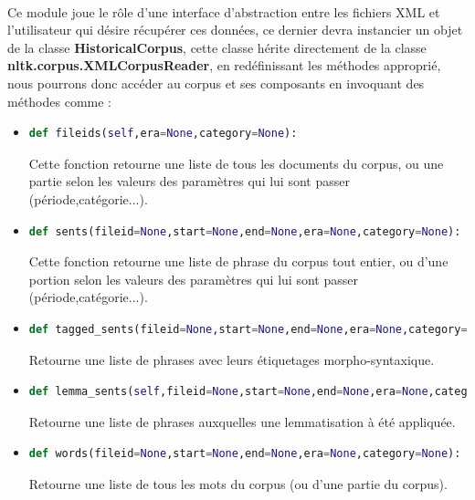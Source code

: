 \documentclass[]{report}
\begin{document}
			\paragraph{}
			Ce module joue le rôle d'une interface d'abstraction entre les fichiers XML et l'utilisateur qui désire récupérer ces données,
			ce dernier devra instancier un objet de la classe \textbf{HistoricalCorpus}, cette classe hérite directement de la classe \textbf{nltk.corpus.XMLCorpusReader}, en redéfinissant les méthodes approprié, nous pourrons donc accéder au corpus et ses composants en 
			invoquant des méthodes comme : 
			\begin{itemize}
				
				\item 
				\begin{lstlisting}[language=python]
					def fileids(self,era=None,category=None):\end{lstlisting} 
				Cette fonction retourne une liste de tous les documents du corpus, ou une partie selon les valeurs des paramètres qui lui sont passer (période,catégorie...).
				
				\item 
				
				\begin{lstlisting}[language=python]
				def sents(fileid=None,start=None,end=None,era=None,category=None):\end{lstlisting} 
				Cette fonction retourne une liste de phrase du corpus tout entier, ou d'une portion selon les valeurs des paramètres qui lui sont passer (période,catégorie...).
				
				\item 
				\begin{lstlisting}[language=python]
					def tagged_sents(fileid=None,start=None,end=None,era=None,category=None):\end{lstlisting}
				Retourne une liste de phrases avec leurs étiquetages morpho-syntaxique.
				
				\item 
				\begin{lstlisting}[language=python]
				def lemma_sents(self,fileid=None,start=None,end=None,era=None,category=None):\end{lstlisting}
				Retourne une liste de phrases auxquelles une lemmatisation à été appliquée.
				
				
				\item 
				\begin{lstlisting}[language=python]
					def words(fileid=None,start=None,end=None,era=None,category=None):\end{lstlisting}
				Retourne une liste de tous les mots du corpus (ou d'une partie du corpus).
				

\end{itemize}
\end{document}
